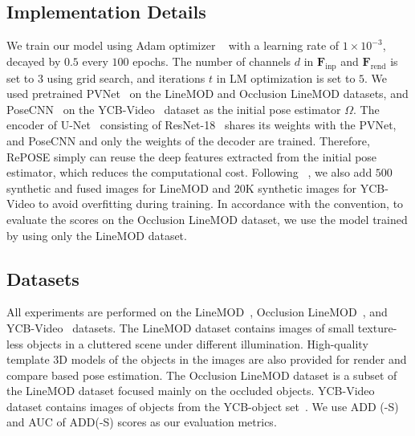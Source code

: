 \documentclass[10pt,twocolumn,letterpaper]{article}
\begin{document}
\subsection{Implementation Details}
We train our model using Adam optimizer ~\cite{DBLP:journals/corr/KingmaB14} with a learning rate of $1 \times 10^{-3}$, decayed by $0.5$ every $100$ epochs. The number of channels $d$ in $\mathbf{F}_\text{inp}$ and $\mathbf{F}_\text{rend}$ is set to $3$ using grid search, and iterations $t$ in LM optimization is set to $5$.
We used pretrained PVNet~\cite{peng2019pvnet} on the LineMOD and Occlusion LineMOD datasets, and PoseCNN~\cite{xiang2018posecnn} on the YCB-Video~\cite{xiang2018posecnn} dataset as the initial pose estimator $\Omega$. The encoder of U-Net~\cite{RFB15a} consisting of ResNet-18~\cite{7780459} shares its weights with the PVNet, and PoseCNN and only the weights of the decoder are trained. Therefore, RePOSE simply can reuse the deep features extracted from the initial pose estimator, which reduces the computational cost. Following ~\cite{peng2019pvnet}, we also add $500$ synthetic and fused images for LineMOD and $20$K synthetic images for YCB-Video to avoid overfitting during training. In accordance with the convention, to evaluate the scores on the Occlusion LineMOD dataset, we use the model trained by using only the LineMOD dataset.

\subsection{Datasets}
All experiments are performed on the LineMOD~\cite{linemod}, Occlusion LineMOD~\cite{10.1007/978-3-319-10605-2_35}, and YCB-Video~\cite{xiang2018posecnn} datasets. The LineMOD dataset contains images of small texture-less objects in a cluttered scene under different illumination. High-quality template 3D models of the objects in the images are also provided for render and compare based pose estimation. The Occlusion LineMOD dataset is a subset of the LineMOD dataset focused mainly on the occluded objects. YCB-Video~\cite{xiang2018posecnn} dataset contains images of objects from the YCB-object set~\cite{7251504}. We use ADD (-S)~\cite{linemod} and AUC of ADD(-S) scores as our evaluation metrics.
\end{document}
